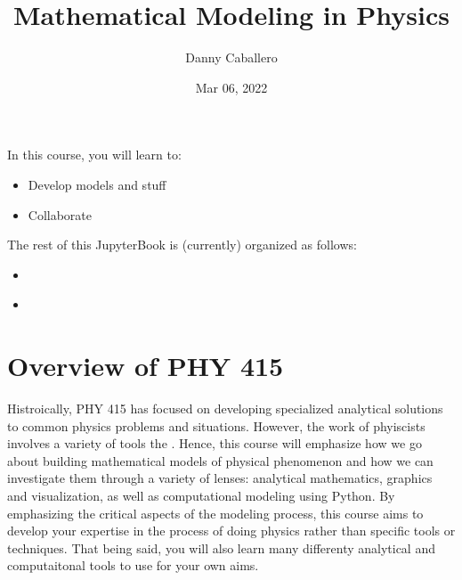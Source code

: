 \documentclass[letterpaper,10pt,english]{jupyterBook}
\title{Mathematical Modeling in Physics}
\date{Mar 06, 2022}
\author{Danny Caballero}
\begin{document}
\pagestyle{empty}
\sphinxmaketitle
\pagestyle{plain}
\sphinxtableofcontents
\pagestyle{normal}
\label{\detokenize{content/intro::doc}}






\sphinxAtStartPar
In this course, you will learn to:
\begin{itemize}
\item {} 
\sphinxAtStartPar
Develop models and stuff

\item {} 
\sphinxAtStartPar
Collaborate

\end{itemize}

\sphinxAtStartPar
The rest of this JupyterBook is (currently) organized as follows:
\begin{itemize}
\item {} 
\sphinxAtStartPar
{\hyperref[\detokenize{content/0_course/syllabus::doc}]{}}

\item {} 
\sphinxAtStartPar
{\hyperref[\detokenize{content/1_modeling/what_is_modeling::doc}]{}}

\end{itemize}


\chapter{Overview of PHY 415}
\label{\detokenize{content/0_course/syllabus:overview-of-phy-415}}\label{\detokenize{content/0_course/syllabus::doc}}
\sphinxAtStartPar
Histroically, PHY 415 has focused on developing specialized analytical solutions to common physics problems and situations. However, the work of phyiscists involves a variety of tools the . Hence, this course will emphasize how we go about building mathematical models of physical phenomenon and how we can investigate them through a variety of lenses: analytical mathematics, graphics and visualization, as well as computational modeling using Python. By emphasizing the critical aspects of the modeling process, this course aims to develop your expertise in the process of doing physics rather than specific tools or techniques. That being said, you will also learn many differenty analytical and computaitonal tools to use for your own aims.
\end{document}
